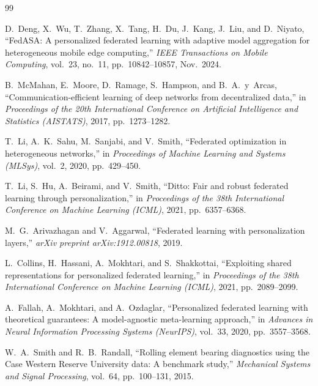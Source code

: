 \documentclass[12pt,a4paper]{report}
\begin{document}
\begin{thebibliography}{99}
\sloppy

D.~Deng, X.~Wu, T.~Zhang, X.~Tang, H.~Du, J.~Kang, J.~Liu, and D.~Niyato, ``FedASA: A personalized federated learning with adaptive model aggregation for heterogeneous mobile edge computing,'' \textit{IEEE Transactions on Mobile Computing}, vol.~23, no.~11, pp.~10842--10857, Nov.~2024.

B.~McMahan, E.~Moore, D.~Ramage, S.~Hampson, and B.~A.~y~Arcas, ``Communication-efficient learning of deep networks from decentralized data,'' in \textit{Proceedings of the 20th International Conference on Artificial Intelligence and Statistics (AISTATS)}, 2017, pp.~1273--1282.

T.~Li, A.~K.~Sahu, M.~Sanjabi, and V.~Smith, ``Federated optimization in heterogeneous networks,'' in \textit{Proceedings of Machine Learning and Systems (MLSys)}, vol.~2, 2020, pp.~429--450.

T.~Li, S.~Hu, A.~Beirami, and V.~Smith, ``Ditto: Fair and robust federated learning through personalization,'' in \textit{Proceedings of the 38th International Conference on Machine Learning (ICML)}, 2021, pp.~6357--6368.

M.~G.~Arivazhagan and V.~Aggarwal, ``Federated learning with personalization layers,'' \textit{arXiv preprint arXiv:1912.00818}, 2019.

L.~Collins, H.~Hassani, A.~Mokhtari, and S.~Shakkottai, ``Exploiting shared representations for personalized federated learning,'' in \textit{Proceedings of the 38th International Conference on Machine Learning (ICML)}, 2021, pp.~2089--2099.

A.~Fallah, A.~Mokhtari, and A.~Ozdaglar, ``Personalized federated learning with theoretical guarantees: A model-agnostic meta-learning approach,'' in \textit{Advances in Neural Information Processing Systems (NeurIPS)}, vol.~33, 2020, pp.~3557--3568.

W.~A.~Smith and R.~B.~Randall, ``Rolling element bearing diagnostics using the Case Western Reserve University data: A benchmark study,'' \textit{Mechanical Systems and Signal Processing}, vol.~64, pp.~100--131, 2015.


\end{thebibliography}
\end{document}
